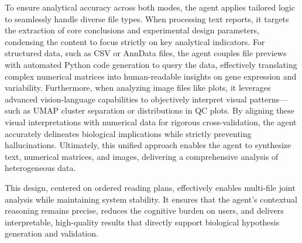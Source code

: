 \documentclass[a4,center,fleqn]{NAR}
\begin{document}

To ensure analytical accuracy across both modes, the agent applies tailored logic to seamlessly handle diverse file types. When processing text reports, it targets the extraction of core conclusions and experimental design parameters, condensing the content to focus strictly on key analytical indicators. For structured data, such as CSV or AnnData files, the agent couples file previews with automated Python code generation to query the data, effectively translating complex numerical matrices into human-readable insights on gene expression and variability. Furthermore, when analyzing image files like plots, it leverages advanced vision-language capabilities to objectively interpret visual patterns—such as UMAP cluster separation or distributions in QC plots. By aligning these visual interpretations with numerical data for rigorous cross-validation, the agent accurately delineates biological implications while strictly preventing hallucinations. Ultimately, this unified approach enables the agent to synthesize text, numerical matrices, and images, delivering a comprehensive analysis of heterogeneous data.

This design, centered on ordered reading plans, effectively enables multi-file joint analysis while maintaining system stability. It ensures that the agent’s contextual reasoning remains precise, reduces the cognitive burden on users, and delivers interpretable, high-quality results that directly support biological hypothesis generation and validation.
\end{document}
